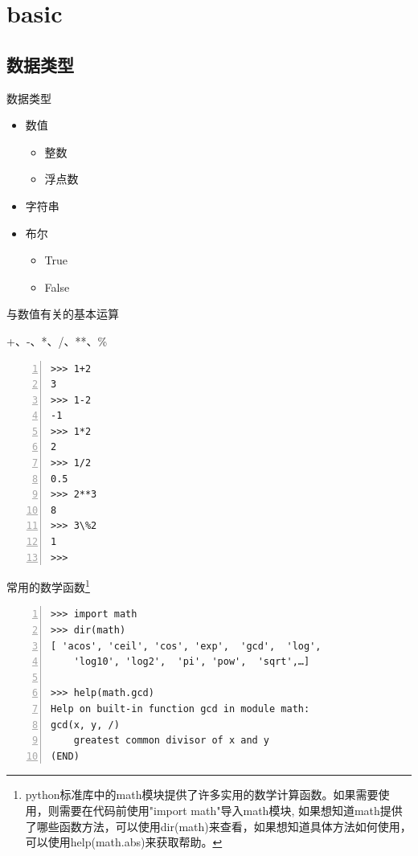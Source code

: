\documentclass{beamer}
\begin{document}
\section{basic}
\begin{frame}
\end{frame}
\subsection{数据类型}
\begin{frame}{数据类型}
\begin{itemize}
\item
数值
\begin{itemize}
\item
整数
\item
浮点数
\end{itemize}
\item
字符串
\item
布尔
\begin{itemize}
\item
True
\item
False
\end{itemize}
\end{itemize}
\end{frame}
\begin{frame}[fragile]{与数值有关的基本运算}
\begin{block}{+、-、*、/、**、\%}
\begin{Verbatim}[numbers=left,frame=single,rulecolor=\color{red}]
>>> 1+2
3
>>> 1-2
-1
>>> 1*2
2
>>> 1/2
0.5
>>> 2**3
8
>>> 3\%2
1
>>> 
\end{Verbatim}
\end{block}

\end{frame}
\begin{frame}[fragile]{常用的数学函数\footnote{python标准库中的math模块提供了许多实用的数学计算函数。如果需要使用，则需要在代码前使用"import math"导入math模块, 如果想知道math提供了哪些函数方法，可以使用dir(math)来查看，如果想知道具体方法如何使用，可以使用help(math.abs)来获取帮助。}}

\begin{block}{}
\begin{Verbatim}[numbers=left,frame=single,rulecolor=\color{red}]
>>> import math
>>> dir(math)
[ 'acos', 'ceil', 'cos', 'exp',  'gcd',  'log', 
    'log10', 'log2',  'pi', 'pow',  'sqrt',…]

>>> help(math.gcd)
Help on built-in function gcd in module math:
gcd(x, y, /)
    greatest common divisor of x and y
(END)
\end{Verbatim}
\end{block}
\end{frame}
\end{document}
